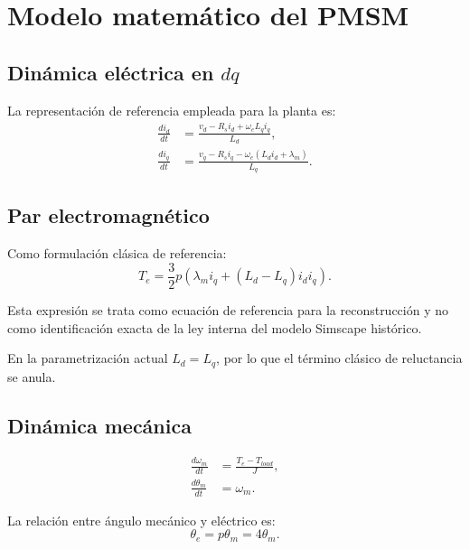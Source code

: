 \section{Modelo matemático del PMSM}

\subsection{Dinámica eléctrica en $dq$}

La representación de referencia empleada para la planta es:
\begin{align}
\frac{di_d}{dt} &= \frac{v_d-R_s i_d+\omega_e L_q i_q}{L_d},\\
\frac{di_q}{dt} &= \frac{v_q-R_s i_q-\omega_e(L_d i_d+\lambda_m)}{L_q}.
\end{align}

\subsection{Par electromagnético}

Como formulación clásica de referencia:
\begin{equation}
T_e=\frac{3}{2}p\left(\lambda_m i_q+(L_d-L_q)i_d i_q\right).
\end{equation}

Esta expresión se trata como ecuación de referencia para la reconstrucción y no como identificación exacta de la ley interna del modelo Simscape histórico.

En la parametrización actual $L_d=L_q$, por lo que el término clásico de reluctancia se anula.

\subsection{Dinámica mecánica}
\begin{align}
\frac{d\omega_m}{dt} &= \frac{T_e-T_{load}}{J},\\
\frac{d\theta_m}{dt} &= \omega_m.
\end{align}

La relación entre ángulo mecánico y eléctrico es:
\begin{equation}
\theta_e=p\theta_m=4\theta_m.
\end{equation}
